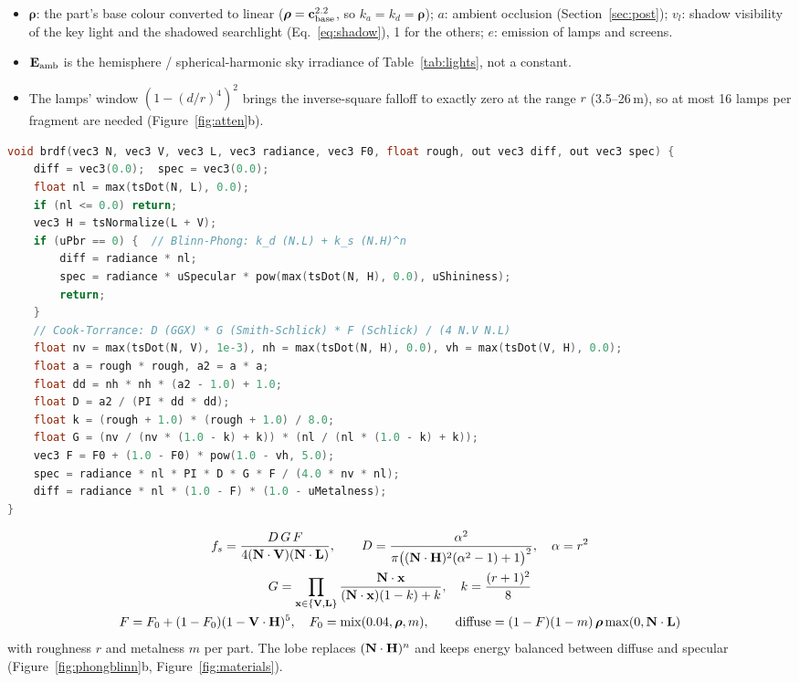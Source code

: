 \begin{itemize}
\item $\boldsymbol\rho$: the part's base colour converted to linear ($\boldsymbol\rho=\mathbf{c}_{\text{base}}^{2.2}$, so $k_a=k_d=\boldsymbol\rho$);
$a$: ambient occlusion (Section~\ref{sec:post}); $v_l$: shadow visibility of the key light and the shadowed searchlight
(Eq.~\eqref{eq:shadow}), 1 for the others; $e$: emission of lamps and screens.
\item $\mathbf{E}_{\text{amb}}$ is the hemisphere / spherical-harmonic sky irradiance of Table~\ref{tab:lights}, not a constant.
\item The lamps' window $(1-(d/r)^4)^2$ brings the inverse-square falloff to exactly zero at the range $r$
(3.5--26\,m), so at most 16 lamps per fragment are needed (Figure~\ref{fig:atten}b).
\end{itemize}
\begin{lstlisting}[language=C++,caption={The per-light reflectance, Blinn--Phong and Cook--Torrance (\code{src/rendering/ShaderSources.cpp: brdf}, OpenGL Shading Language).}]
void brdf(vec3 N, vec3 V, vec3 L, vec3 radiance, vec3 F0, float rough, out vec3 diff, out vec3 spec) {
    diff = vec3(0.0);  spec = vec3(0.0);
    float nl = max(tsDot(N, L), 0.0);
    if (nl <= 0.0) return;
    vec3 H = tsNormalize(L + V);
    if (uPbr == 0) {  // Blinn-Phong: k_d (N.L) + k_s (N.H)^n
        diff = radiance * nl;
        spec = radiance * uSpecular * pow(max(tsDot(N, H), 0.0), uShininess);
        return;
    }
    // Cook-Torrance: D (GGX) * G (Smith-Schlick) * F (Schlick) / (4 N.V N.L)
    float nv = max(tsDot(N, V), 1e-3), nh = max(tsDot(N, H), 0.0), vh = max(tsDot(V, H), 0.0);
    float a = rough * rough, a2 = a * a;
    float dd = nh * nh * (a2 - 1.0) + 1.0;
    float D = a2 / (PI * dd * dd);
    float k = (rough + 1.0) * (rough + 1.0) / 8.0;
    float G = (nv / (nv * (1.0 - k) + k)) * (nl / (nl * (1.0 - k) + k));
    vec3 F = F0 + (1.0 - F0) * pow(1.0 - vh, 5.0);
    spec = radiance * nl * PI * D * G * F / (4.0 * nv * nl);
    diff = radiance * nl * (1.0 - F) * (1.0 - uMetalness);
}
\end{lstlisting}
\begin{gather}
f_s=\frac{D\,G\,F}{4(\mathbf{N}\cdot\mathbf{V})(\mathbf{N}\cdot\mathbf{L})},\qquad
D=\frac{\alpha^2}{\pi\big((\mathbf{N}\cdot\mathbf{H})^2(\alpha^2-1)+1\big)^2},\quad \alpha=r^2\label{eq:ggx}\\
G=\prod_{\mathbf{x}\in\{\mathbf{V},\mathbf{L}\}}\frac{\mathbf{N}\cdot\mathbf{x}}{(\mathbf{N}\cdot\mathbf{x})(1-k)+k},\quad k=\frac{(r+1)^2}{8}\nonumber\\
F=F_0+(1-F_0)(1-\mathbf{V}\cdot\mathbf{H})^5,\quad F_0=\operatorname{mix}(0.04,\boldsymbol\rho,m),\qquad
\text{diffuse}=(1-F)(1-m)\,\boldsymbol\rho\max(0,\mathbf{N}\cdot\mathbf{L})\nonumber
\end{gather}
with roughness $r$ and metalness $m$ per part. The  lobe replaces $(\mathbf{N}\cdot\mathbf{H})^n$ and keeps energy balanced
between diffuse and specular (Figure~\ref{fig:phongblinn}b, Figure~\ref{fig:materials}).

